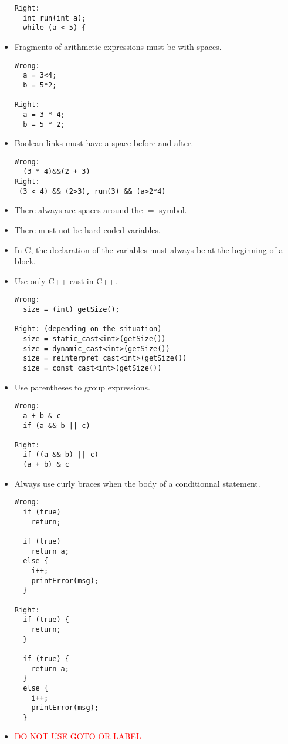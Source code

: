\documentclass{article}
\begin{document}
\begin{itemize}
\begin{verbatim}
Right: 
  int run(int a);
  while (a < 5) {
\end{verbatim}
\item Fragments of arithmetic expressions must be with
 spaces.
\begin{verbatim}
Wrong: 
  a = 3<4;
  b = 5*2;

Right:
  a = 3 * 4;
  b = 5 * 2;
\end{verbatim}
\item Boolean links must have a space before and after.
\begin{verbatim}
Wrong:
  (3 * 4)&&(2 + 3)
Right:
 (3 < 4) && (2>3), run(3) && (a>2*4)
\end{verbatim}
\item There always are spaces around the $=$ symbol.
\item There must not be hard coded variables.
\item In C, the declaration of the variables must always be
at the beginning of a block.
\item Use only C++ cast in C++.
\begin{verbatim}
Wrong:
  size = (int) getSize();

Right: (depending on the situation)
  size = static_cast<int>(getSize())
  size = dynamic_cast<int>(getSize())
  size = reinterpret_cast<int>(getSize())
  size = const_cast<int>(getSize())
\end{verbatim}
\item Use parentheses to group expressions.
\begin{verbatim}
Wrong:
  a + b & c
  if (a && b || c)

Right:
  if ((a && b) || c)
  (a + b) & c
\end{verbatim}
\item Always use curly braces when the body of a conditionnal statement.
\begin{verbatim}
Wrong:
  if (true)
    return;

  if (true) 
    return a;
  else {
    i++;
    printError(msg);
  }

Right:
  if (true) {
    return;
  }

  if (true) {
    return a;
  }
  else {
    i++;
    printError(msg);
  }
\end{verbatim} 
\item \textcolor{red}{DO NOT USE GOTO OR LABEL}
\end{itemize}
\end{document}

